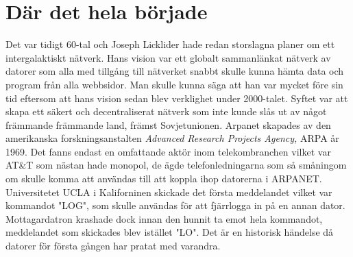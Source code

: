 \documentclass[a4paper,11pt]{article}
\begin{document}
\section{Där det hela började}
Det var tidigt 60-tal och Joseph Licklider hade redan storslagna planer om ett
intergalaktiskt nätverk. Hans vision var ett globalt sammanlänkat nätverk av
datorer som alla med tillgång till nätverket snabbt skulle kunna hämta data och
program från alla webbsidor. Man skulle kunna säga att han var mycket före sin
tid eftersom att hans vision sedan blev verklighet under 2000-talet. Syftet var
att skapa ett säkert och decentraliserat nätverk som inte kunde slås ut av något
främmande främmande land, främst Sovjetunionen. Arpanet skapades av den
amerikanska forskningsanstalten \textit{Advanced Research Projects Agency,} ARPA
år 1969. Det fanns endast en omfattande aktör inom telekombranchen vilket var
AT\&T som nästan hade monopol, de ägde telefonledningarna som så småningom om
skulle komma att användas till att koppla ihop datorerna i ARPANET.
Universitetet UCLA i Kaliforninen skickade det första meddelandet vilket var
kommandot "LOG", som skulle användas för att fjärrlogga in på en annan dator.
Mottagardatron krashade dock innan den hunnit ta emot hela kommandot,
meddelandet som skickades blev istället "LO". Det är en historisk händelse då
datorer för första gången har pratat med varandra.
\end{document}
